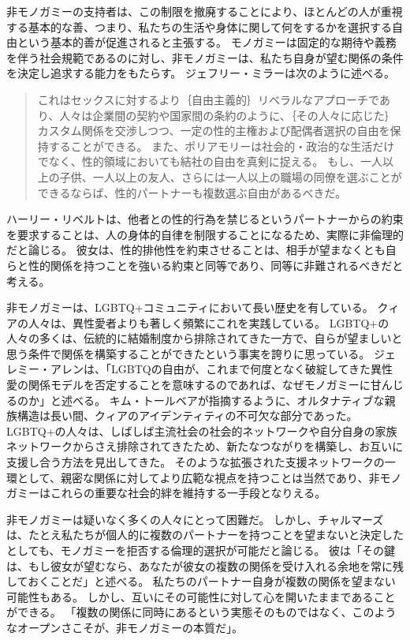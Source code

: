\documentclass[paper=a4,book,openany]{jlreq}
\newcommand{\ig}[1]{}           %
\begin{document}
非モノガミーの支持者は、この制限を撤廃することにより、ほとんどの人が重視する基本的な善、つまり、私たちの生活や身体に関して何をするかを選択する自由という基本的善が促進されると主張する。
モノガミーは固定的な期待や義務を伴う社会規範であるのに対し、非モノガミーは、私たち自身が望む関係の条件を決定し追求する能力をもたらす。
ジェフリー・ミラー\ig{Geoffrey Miller}は次のように述べる。

\begin{quote}
これはセックスに対するより｛自由主義的｝{リベラル}なアプローチであり、人々は企業間の契約や国家間の条約のように、｛その人々に応じた｝{カスタム}関係を交渉しつつ、一定の性的主権および配偶者選択の自由を保持することができる。
また、ポリアモリーは社会的・政治的な生活だけでなく、性的領域においても結社の自由を真剣に捉える。
もし、一人以上の子供、一人以上の友人、さらには一人以上の職場の同僚を選ぶことができるならば、性的パートナーも複数選ぶ自由があるべきだ。
\citep{miller19:_polyam_is_growin}

\end{quote}

ハーリー・リベルトは、他者との性的行為を禁じるというパートナーからの約束を要求することは、人の身体的自律を制限することになるため、実際に非倫理的だと論じる。
彼女は、性的排他性を約束させることは、相手が望まなくとも自らと性的関係を持つことを強いる約束と同等であり、同等に非難されるべきだと考える\citep{liberto17:_prob_sexual_prom}。

非モノガミーは、LGBTQ+コミュニティにおいて長い歴史を有している。
クィアの人々は、異性愛者よりも著しく頻繁にこれを実践している\citep{haupert17:_preval_exper_consen_nonmon_relat}。
LGBTQ+の人々の多くは、伝統的に結婚制度から排除されてきた一方で、自らが望ましいと思う条件で関係を構築することができたという事実を誇りに思っている。
ジェレミー・アレンは、「LGBTQの自由が、これまで何度となく破綻してきた異性愛の関係モデルを否定することを意味するのであれば、なぜモノガミーに甘んじるのか」と述べる\citep{allen20:_his_body_doesn_belon_me}。
キム・トールベアが指摘するように、オルタナティブな親族構造は長い間、クィアのアイデンティティの不可欠な部分であった。
LGBTQ+の人々は、しばしば主流社会の社会的ネットワークや自分自身の家族ネットワークからさえ排除されてきたため、新たなつながりを構築し、お互いに支援し合う方法を見出してきた。
そのような拡張された支援ネットワークの一環として、親密な関係に対してより広範な視点を持つことは当然であり、非モノガミーはこれらの重要な社会的絆を維持する一手段となりえる\citep{podcast18:_episod}。

非モノガミーは疑いなく多くの人々にとって困難だ。
しかし、チャルマーズは、たとえ私たちが個人的に複数のパートナーを持つことを望まないと決定したとしても、モノガミーを拒否する倫理的選択が可能だと論じる。
彼は「その鍵は、もし彼女が望むなら、あなたが彼女の複数の関係を受け入れる余地を常に残しておくことだ」と述べる\citep[p.241]{chalmers19:_is_monog_moral_permis}。
私たちのパートナー自身が複数の関係を望まない可能性もある。
しかし、互いにその可能性に対して心を開いたままであることができる。
「複数の関係に同時にあるという実態そのものではなく、このようなオープンさこそが、非モノガミーの本質だ」\citep[p.241]{chalmers19:_is_monog_moral_permis}。
\end{document}
